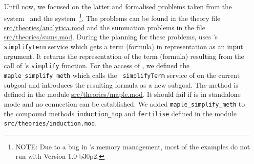 Until now, we focused on the latter and formalised problems taken from
the {\analytica} system~\cite{Clarke92-1,BaClZh:aectpsc98} and the
{\clamlite} system~\cite{Walsh00}\footnote{NOTE: Due to a bug in
  {\teyjus}'s memory management, most of the examples do not run with
  {\teyjus} Version 1.0-b30p2.}. The {\analytica} problems can be
found in the theory file \url{src/theories/analytica.mod} and the
summation problems in the file \url{src/theories/sums.mod}.  During
the planning for these problems, {\lclam} uses {\maple}'s {\tt
  simplifyTerm} service which gets a term (formula) in {\openmath}
representation as an input argument. It returns the {\openmath}
representation of the term (formula) resulting from the call of
{\maple}'s {\tt simplify} function.  For the access of {\maple}, we
defined the {\tt maple\_simplify\_meth} which calls the {\tt
  simplifyTerm} service of {\maple} on the current subgoal and
introduces the resulting formula as a new subgoal. The method is
defined in the module \url{src/theories/maple.mod}. It should fail if
{\lclam} is in standalone mode and no {\mathwebsb} connection can be
established.  We added {\tt maple\_simplify\_meth} to the compound
methods {\tt induction\_top} and {\tt fertilise} defined in the module
{\tt src/theories/induction.mod}.


